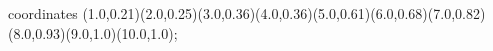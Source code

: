 					coordinates { (1.0,0.21)(2.0,0.25)(3.0,0.36)(4.0,0.36)(5.0,0.61)(6.0,0.68)(7.0,0.82)(8.0,0.93)(9.0,1.0)(10.0,1.0)};